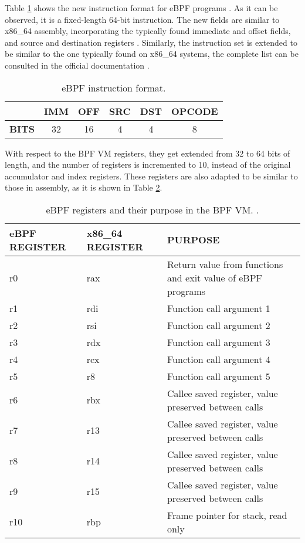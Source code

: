 Table \ref{table:ebpf_inst_format} shows the new instruction format for eBPF programs \cite{ebpf_inst_set}. As it can be observed, it is a fixed-length 64-bit instruction. The new fields are similar to x86\_64 assembly, incorporating the typically found immediate and offset fields, and source and destination registers \cite{8664_inst_set_specs}. Similarly, the instruction set is extended to be similar to the one typically found on x86\_64 systems, the complete list can be consulted in the official documentation \cite{ebpf_inst_set}.

\begin{table}[htbp]
\begin{tabular}{|c|c|c|c|c|c|}
\hline
& \textbf{IMM} & \textbf{OFF} & \textbf{SRC} & \textbf{DST} & \textbf{OPCODE} \\
\hline
\textbf{BITS} & 32 & 16 & 4 & 4 & 8\\
\hline
\end{tabular}
\caption{eBPF instruction format.}
\label{table:ebpf_inst_format}
\end{table}

With respect to the BPF VM registers, they get extended from 32 to 64 bits of length, and the number of registers is incremented to 10, instead of the original accumulator and index registers. These registers are also adapted to be similar to those in assembly, as it is shown in Table \ref{table:ebpf_regs}.

\begin{table}[htbp]
\begin{tabular}{|>{\centering\arraybackslash}p{2.5cm}|>{\centering\arraybackslash}p{2.5cm}|>{\centering\arraybackslash}p{7cm}|}
\hline
\textbf{eBPF REGISTER} & \textbf{x86\_64 REGISTER} & \textbf{PURPOSE}\\
\hline
\hline
r0 & rax & Return value from functions and exit value of eBPF programs\\
\hline
r1 & rdi & Function call argument 1\\
\hline
r2 & rsi & Function call argument 2\\
\hline
r3 & rdx & Function call argument 3\\
\hline
r4 & rcx & Function call argument 4\\
\hline
r5 & r8 & Function call argument 5\\
\hline
r6 & rbx & Callee saved register, value preserved between calls\\
\hline
r7 & r13 & Callee saved register, value preserved between calls\\
\hline
r8 & r14 & Callee saved register, value preserved between calls\\
\hline
r9 & r15 & Callee saved register, value preserved between calls\\
\hline
r10 & rbp & Frame pointer for stack, read only\\
\hline
\end{tabular}
\caption{eBPF registers and their purpose in the BPF VM. \cite{ebpf_inst_set} \cite{ebpf_starovo_slides}.}
\label{table:ebpf_regs}
\end{table}

